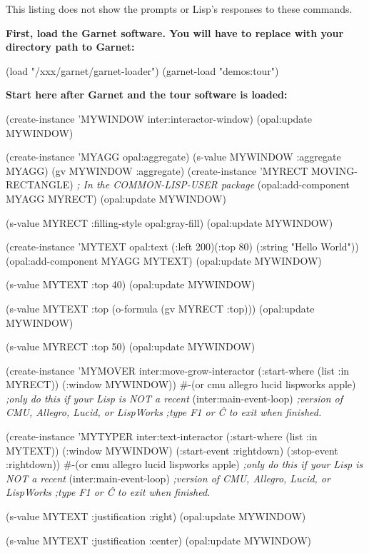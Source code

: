 This listing does not show the prompts or Lisp's responses to these commands.

{\bf First, load the Garnet software.  You will have to replace 
with your directory path to Garnet:}
\begin{programexample}
(load "/xxx/garnet/garnet-loader")
(garnet-load "demos:tour")
\end{programexample}


{\bf Start here after Garnet and the tour software is loaded:}
\begin{programexample}
(create-instance 'MYWINDOW inter:interactor-window)
(opal:update MYWINDOW)

(create-instance 'MYAGG opal:aggregate)
(s-value MYWINDOW :aggregate MYAGG)
(gv MYWINDOW :aggregate)
(create-instance 'MYRECT MOVING-RECTANGLE) {\it ; In the COMMON-LISP-USER package}
(opal:add-component MYAGG MYRECT)
(opal:update MYWINDOW)

(s-value MYRECT :filling-style opal:gray-fill)
(opal:update MYWINDOW)

(create-instance 'MYTEXT opal:text (:left 200)(:top 80)
	(:string "Hello World"))
(opal:add-component MYAGG MYTEXT)
(opal:update MYWINDOW)

(s-value MYTEXT :top 40)
(opal:update MYWINDOW)

(s-value MYTEXT :top (o-formula (gv MYRECT :top)))
(opal:update MYWINDOW)

(s-value MYRECT :top 50)
(opal:update MYWINDOW)

(create-instance 'MYMOVER inter:move-grow-interactor
  (:start-where (list :in MYRECT))
  (:window MYWINDOW))
\#-(or cmu allegro lucid lispworks apple)  {\it ;only do this if your Lisp is NOT a recent}
(inter:main-event-loop)                   {\it ;version of CMU, Allegro, Lucid, or LispWorks}
                                          {\it ;type F1 or \^C to exit when finished.}

(create-instance 'MYTYPER inter:text-interactor
  (:start-where (list :in MYTEXT))
  (:window MYWINDOW)
  (:start-event :rightdown)
  (:stop-event :rightdown))
\#-(or cmu allegro lucid lispworks apple)  {\it ;only do this if your Lisp is NOT a recent}
(inter:main-event-loop)                   {\it ;version of CMU, Allegro, Lucid, or LispWorks}
                                          {\it ;type F1 or \^C to exit when finished.}

(s-value MYTEXT :justification :right)
(opal:update MYWINDOW)

(s-value MYTEXT :justification :center)
(opal:update MYWINDOW)


\end{programexample}
